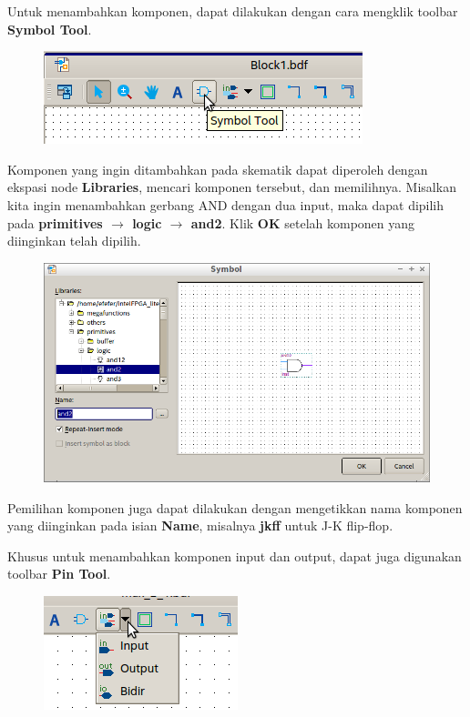 Untuk menambahkan komponen, dapat dilakukan dengan cara mengklik toolbar
\textbf{Symbol Tool}.

\begin{figure}[H]
\centering
\includegraphics[scale=0.5]{images/SymbolTool.png}
\par
\end{figure}

Komponen yang ingin ditambahkan pada skematik dapat diperoleh dengan
ekspasi node \textbf{Libraries}, mencari komponen tersebut, dan memilihnya.
Misalkan kita ingin menambahkan gerbang AND dengan dua input, maka dapat dipilih
pada \textbf{primitives $\rightarrow$ logic $\rightarrow$ and2}. Klik
\textbf{OK} setelah komponen yang diinginkan telah dipilih.

\begin{figure}[H]
\centering
\includegraphics[scale=0.5]{images/BlockAnd.png}
\par
\end{figure}

Pemilihan komponen juga dapat dilakukan dengan mengetikkan nama komponen yang
diinginkan pada isian \textbf{Name}, misalnya \textbf{jkff} untuk J-K flip-flop.

Khusus untuk menambahkan komponen input dan output, dapat juga digunakan
toolbar \textbf{Pin Tool}.
\begin{figure}[H]
\centering
\includegraphics[scale=0.5]{images/PinTool.png}
\par
\end{figure}

